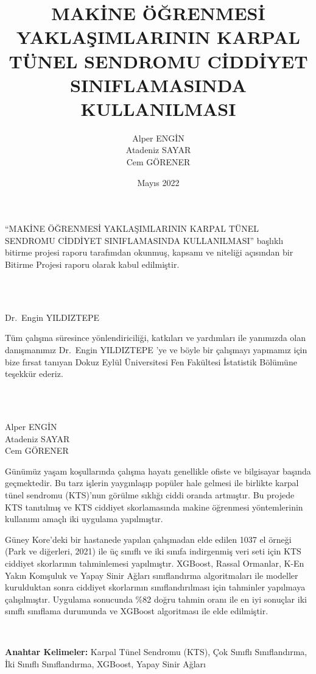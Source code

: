\documentclass[12pt,twoside]{deuthesis}
\title{MAKİNE ÖĞRENMESİ YAKLAŞIMLARININ KARPAL TÜNEL SENDROMU CİDDİYET SINIFLAMASINDA KULLANILMASI}
\author{Alper ENGİN \\ Atadeniz SAYAR \\ Cem GÖRENER} %
\date{Mayıs 2022}
\begin{document}
  \maketitle

\frontmatter %
\pagestyle{empty} %
\begin{preface}
	``MAKİNE ÖĞRENMESİ YAKLAŞIMLARININ KARPAL TÜNEL SENDROMU CİDDİYET SINIFLAMASINDA KULLANILMASI'' başlıklı bitirme projesi raporu tarafımdan okunmuş, kapsamı ve niteliği açısından bir Bitirme Projesi raporu olarak kabul edilmiştir.\\
 \strut \\
 \strut \\
 Dr.~Engin YILDIZTEPE
\end{preface}
  \begin{acknowledgements}
    Tüm çalışma süresince yönlendiriciliği, katkıları ve yardımları ile yanımızda olan danışmanımız Dr.~Engin YILDIZTEPE 'ye ve böyle bir çalışmayı yapmamız için bize fırsat tanıyan Dokuz Eylül Üniversitesi Fen Fakültesi İstatistik Bölümüne teşekkür ederiz.\\
    \strut \\
    \strut \\
    Alper ENGİN\\
    Atadeniz SAYAR\\
    Cem GÖRENER\\
  \end{acknowledgements}
\begin{abstractTR}
	Günümüz yaşam koşullarında çalışma hayatı genellikle ofiste ve bilgisayar başında geçmektedir. Bu tarz işlerin yaygınlaşıp popüler hale gelmesi ile birlikte karpal tünel sendromu (KTS)'nun görülme sıklığı ciddi oranda artmıştır. Bu projede KTS tanıtılmış ve KTS ciddiyet skorlamasında makine öğrenmesi yöntemlerinin kullanımı amaçlı iki uygulama yapılmıştır.\\
 \hspace*{0.333em}

 \par

 Güney Kore'deki bir hastanede yapılan çalışmadan elde edilen 1037 el örneği (Park ve diğerleri, 2021) ile üç sınıflı ve iki sınıfa indirgenmiş veri seti için KTS ciddiyet skorlarının tahminlemesi yapılmıştır. XGBoost, Rassal Ormanlar, K-En Yakın Komşuluk ve Yapay Sinir Ağları sınıflandırma algoritmaları ile modeller kurulduktan sonra ciddiyet skorlarının sınıflandırılması için tahminler yapılmaya çalışılmıştır. Uygulama sonucunda \%82 doğru tahmin oranı ile en iyi sonuçlar iki sınıflı sınıflama durumunda ve XGBoost algoritması ile elde edilmiştir.

 ~

 \textbf{Anahtar Kelimeler:} Karpal Tünel Sendromu (KTS), Çok Sınıflı Sınıflandırma, İki Sınıflı Sınıflandırma, XGBoost, Yapay Sinir Ağları
\end{abstractTR}
\end{document}
